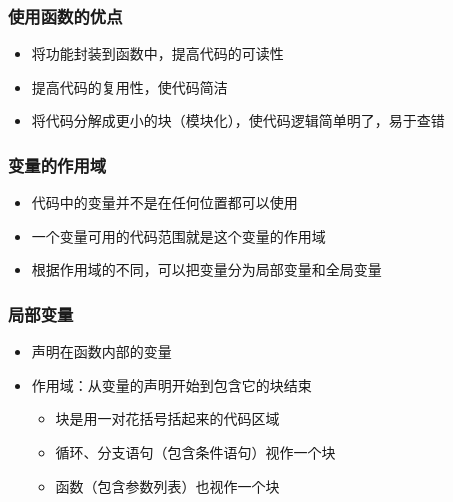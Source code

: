 \begin{frame}[fragile]
    \frametitle{使用函数的优点}

        \begin{itemize}
            \item 将功能封装到函数中，提高代码的可读性
            \item 提高代码的复用性，使代码简洁
            \item 将代码分解成更小的块（模块化），使代码逻辑简单明了，易于查错
        \end{itemize}
    
\end{frame}

\begin{frame}[fragile]
    \frametitle{变量的作用域}

        \begin{itemize}
            \item<1-> 代码中的变量并不是在任何位置都可以使用
            \item<2-> 一个变量可用的代码范围就是这个变量的作用域
            \item<3-> 根据作用域的不同，可以把变量分为局部变量和全局变量
        \end{itemize}
    
\end{frame}

\begin{frame}[fragile]
    \frametitle{局部变量}

        \begin{itemize}
            \item 声明在函数内部的变量
            \item 作用域：从变量的声明开始到包含它的块结束

            \begin{itemize}
                \item 块是用一对花括号括起来的代码区域
                \item 循环、分支语句（包含条件语句）视作一个块
                \item 函数（包含参数列表）也视作一个块
            \end{itemize}
            
        \end{itemize}
    
\end{frame}

